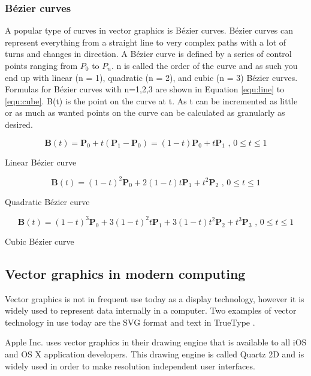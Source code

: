 \subsubsection{Bézier curves}
\label{sec:bezier}
A popular type of curves in vector graphics is Bézier curves.
Bézier curves can represent everything from a straight line to very complex paths with a lot of turns and changes in direction.
A Bézier curve is defined by a series of control points ranging from \(P_0\) to \(P_n\).
n is called the order of the curve and as such you end up with linear (n = 1), quadratic (n = 2), and cubic (n = 3) Bézier curves.
Formulas for Bézier curves with n=1,2,3 are shown in Equation \ref{equ:line} to \ref{equ:cube}.
B(t) is the point on the curve at t.
As t can be incremented as little or as much as wanted points on the curve can be calculated as granularly as desired.

\begin{cequation}[H]
	\begin{equation}
	    \label{equ:line}
		\mathbf{B}(t)=\mathbf{P}_0 + t(\mathbf{P}_1-\mathbf{P}_0)=(1-t)\mathbf{P}_0 + t\mathbf{P}_1 \mbox{ , } 0 \le t \le 1
	\end{equation}
	\caption{Linear Bézier curve}
\end{cequation}

\begin{cequation}[H]
	\begin{equation}
		\mathbf{B}(t) = (1 - t)^{2}\mathbf{P}_0 + 2(1 - t)t\mathbf{P}_1 + t^{2}\mathbf{P}_2 \mbox{ , } 0 \le t \le 1
	\end{equation}
	\caption{Quadratic Bézier curve}
\end{cequation}

\begin{cequation}[H]
	\begin{equation}
	    \label{equ:cube}
		\mathbf{B}(t)=(1-t)^3\mathbf{P}_0+3(1-t)^2t\mathbf{P}_1+3(1-t)t^2\mathbf{P}_2+t^3\mathbf{P}_3 \mbox{ , } 0 \le t \le 1
	\end{equation}
	\caption{Cubic Bézier curve}
\end{cequation}

\subsection{Vector graphics in modern computing}

Vector graphics is not in frequent use today as a display technology, however it is widely used to represent data internally in a computer.
Two examples of vector technology in use today are the SVG format and text in TrueType \cite{truetype}.

Apple Inc. \cite{apple} uses vector graphics in their drawing engine that is available to all iOS and OS X application developers.
This drawing engine is called Quartz 2D \cite{quartz2d} and is widely used in order to make resolution independent user interfaces.
